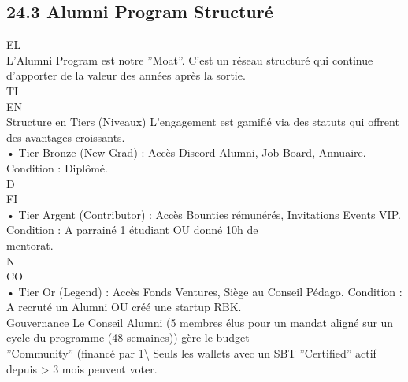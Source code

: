 \subsection{24.3 Alumni Program Structuré}
\vspace{0.5em}
\vspace{0.5em}
\vspace{0.5em}
\vspace{0.5em}
EL\\
L’Alumni Program est notre ”Moat”. C’est un réseau structuré qui continue d’apporter de la valeur des années après la sortie.\\
\vspace{0.5em}
\vspace{0.5em}
\vspace{0.5em}
\vspace{0.5em}
TI\\
EN\\
Structure en Tiers (Niveaux)     L’engagement est gamifié via des statuts qui offrent des avantages croissants.\\
\vspace{0.5em}
• Tier Bronze (New Grad) : Accès Discord Alumni, Job Board, Annuaire. Condition : Diplômé.\\
\vspace{0.5em}
\vspace{0.5em}
\vspace{0.5em}
\vspace{0.5em}
D\\
FI\\
• Tier Argent (Contributor) : Accès Bounties rémunérés, Invitations Events VIP. Condition : A parrainé 1 étudiant OU donné 10h de\\
mentorat.\\
N\\
CO\\
• Tier Or (Legend) : Accès Fonds Ventures, Siège au Conseil Pédago. Condition : A recruté un Alumni OU créé une startup RBK.\\
\vspace{0.5em}
Gouvernance Le Conseil Alumni (5 membres élus pour un mandat aligné sur un cycle du programme (48 semaines)) gère le budget\\
”Community” (financé par 1\textbackslash{}%
Seuls les wallets avec un SBT ”Certified” actif depuis \textgreater{} 3 mois peuvent voter.\\
